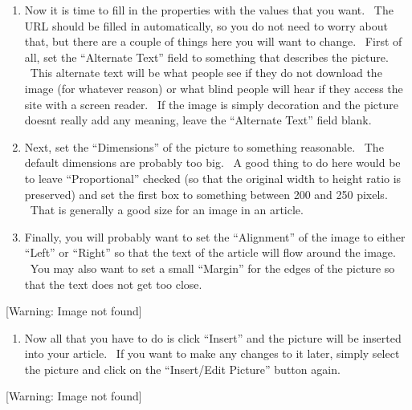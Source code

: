 \documentclass[12pt,twoside]{article}
\newcounter{saveenum}
\newcommand\liststyleLii{%
\renewcommand\theenumi{\arabic{enumi}}
\renewcommand\theenumii{\arabic{enumii}}
\renewcommand\theenumiii{\arabic{enumiii}}
\renewcommand\theenumiv{\arabic{enumiv}}
\renewcommand\labelenumi{2.\theenumi)}
\renewcommand\labelenumii{\theenumii.}
\renewcommand\labelenumiii{\theenumiii.}
\renewcommand\labelenumiv{\theenumiv.}
}
\begin{document}
\liststyleLii
\setcounter{saveenum}{\value{enumi}}
\begin{enumerate}
\setcounter{enumi}{\value{saveenum}}
\item {
Now it is time to fill in the properties with the values that you want.
\ The URL should be filled in automatically, so you do not need to
worry about that, but there are a couple of things here you will want
to change. \ First of all, set the ``Alternate Text'' field to
something that describes the picture. \ This alternate text will be
what people see if they do not download the image (for whatever reason)
or what blind people will hear if they access the site with a screen
reader. \ If the image is simply decoration and the picture
doesn{\textquotesingle}t really add any meaning, leave the ``Alternate
Text'' field blank.}
\item {
Next, set the ``Dimensions'' of the picture to something reasonable.
\ The default dimensions are probably too big. \ A good thing to do
here would be to leave ``Proportional'' checked (so that the original
width to height ratio is preserved) and set the first box to something
between 200 and 250 pixels. \ That is generally a good size for an
image in an article.}
\item {
Finally, you will probably want to set the ``Alignment'' of the image to
either ``Left'' or ``Right'' so that the text of the article will flow
around the image. \ You may also want to set a small ``Margin'' for the
edges of the picture so that the text does not get too close.}
\end{enumerate}
{\centering{}
 [Warning: Image not found] 
\par}

\liststyleLii
\setcounter{saveenum}{\value{enumi}}
\begin{enumerate}
\setcounter{enumi}{\value{saveenum}}
\item {
Now all that you have to do is click ``Insert'' and the picture will be
inserted into your article. \ If you want to make any changes to it
later, simply select the picture and click on the ``Insert/Edit
Picture'' button again.}
\end{enumerate}
{\centering{}
 [Warning: Image not found] 
\par}

\clearpage\subsection{}
\end{document}
